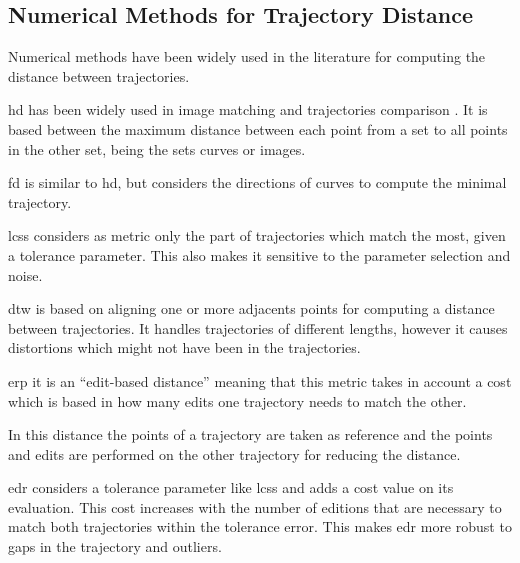 \subsection{Numerical Methods for Trajectory Distance}\label{sec: numerical methods}

Numerical methods have been widely used in the literature for computing the distance between trajectories.


\gls{hd} has been widely used in image matching \cite{huttenlocher1993comparing,jesorsky2001robust} and trajectories comparison \cite{belogay1997calculating}. It is based between the maximum distance between each point from a set to all points in the other set, being the sets curves or images.


\gls{fd} \cite{eiter1994computing} is similar to \gls{hd}, but considers the directions of curves to compute the minimal trajectory.



\gls{lcss} \cite{maier1978complexity} considers as metric only the part of trajectories which match the most, given a tolerance parameter. This also makes it sensitive to the parameter selection and noise.


\gls{dtw} \cite{sankoff1983time,yi1998efficient} is based on aligning one or more adjacents points for computing a distance between trajectories. It handles trajectories of different lengths, however it causes distortions which might not have been in the trajectories.


\gls{erp} \cite{chen2004marriage} it is an ``edit-based distance'' meaning that this metric takes in account a cost which is based in how many edits one trajectory needs to match the other. 

In this distance the points of a trajectory are taken as reference and the points and edits are performed on the other trajectory for reducing the distance.


\gls{edr} \cite{chen2005robust} considers a tolerance parameter like \gls{lcss} and adds a cost value on its evaluation. This cost increases with the number of editions that are necessary to match both trajectories within the tolerance error.
%
This makes \gls{edr} more robust to gaps in the trajectory and outliers.

